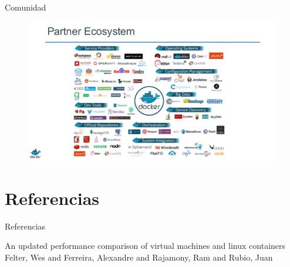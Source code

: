 \documentclass[compress]{beamer}
\begin{document}
\begin{frame}{Comunidad}
\begin{figure}[H]
  \centering
  \includegraphics[width=1\textwidth]{images/ecosystem.jpg}
    \label{fig:dynamic}
\end{figure}		
\end{frame}
	
\section*{Referencias}
\begin{frame}{Referencias}
	\begin{thebibliography}{10}
    
	\beamertemplatebookbibitems
	An updated performance comparison of virtual machines and linux containers
	\newblock Felter, Wes and Ferreira, Alexandre and Rajamony, Ram and Rubio, Juan
  \end{thebibliography}
\end{frame}

\maketitle
\end{document}
